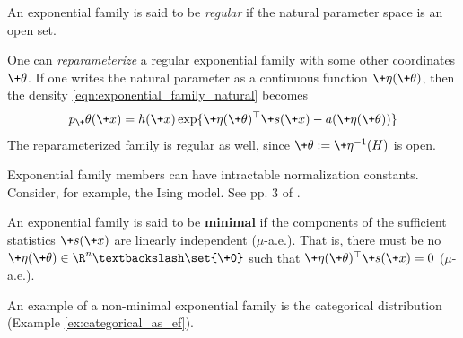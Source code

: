 \documentclass{article} %
\newcommand{\obs}{\+x}
\newcommand{\logNormalizerFunction}{a}
\newcommand{\sufficientStatsFunction}{\+s}
\newcommand{\carrierDensity}{h}
\newcommand{\param}{\+\theta}
\newcommand{\naturalParam}{\+\eta}
\newcommand{\naturalParamSpace}{H}
\begin{document}
\begin{definition}
An exponential family is said to be \textit{regular} if the natural parameter space is an open set.
\end{definition}

\begin{remark}
One can \textit{reparameterize} a regular exponential family with some other coordinates $\param$.  If one writes the natural parameter as a continuous function $\naturalParam(\param)$, then the density \eqref{eqn:exponential_family_natural} becomes
\begin{align}
 p_\param(\obs) = \carrierDensity(\obs) \exp \{ \naturalParam(\param)^\top \sufficientStatsFunction(\obs) - \logNormalizerFunction(\naturalParam(\param))\} 
\label{eqn:exponential_family}
 \end{align}
 The reparameterized family is regular as well, since $\param := \naturalParam^{-1}(\naturalParamSpace)$ is open.
\end{remark}

\begin{remark}
Exponential family members can have intractable normalization constants.  Consider, for example,  the Ising model.  See pp. 3 of \cite{taylor2013multiparameter}.
\end{remark}


\begin{definition}
An exponential family is said to be \textbf{minimal} if the components of the sufficient statistics $\sufficientStatsFunction(\obs)$ are linearly independent ($\mu$-a.e.).  That is, there must be no $\naturalParam(\param) \in \R^n \textbackslash \set{\+0}$ such that $\naturalParam(\param)^\top \sufficientStatsFunction(\obs) = 0$ ($\mu$-a.e.).
\label{def:minimal_exponential_families}
\end{definition}

  An example of a non-minimal exponential family is the categorical distribution (Example \ref{ex:categorical_as_ef}).
\end{document}
